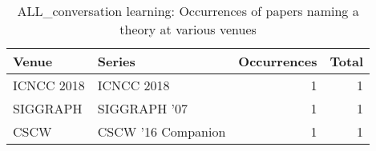 \begin{table*}[t]
\begin{tabular}{llrr}
Venue & Series & Occurrences & Total\\\hline
\multirow{1}{*}{ICNCC 2018} & ICNCC 2018 & 1 & \multirow{1}{*}{1}\\
\multirow{1}{*}{SIGGRAPH } & SIGGRAPH '07 & 1 & \multirow{1}{*}{1}\\
\multirow{1}{*}{CSCW } & CSCW '16 Companion & 1 & \multirow{1}{*}{1}\\
\end{tabular}
\caption{ALL\_conversation learning: Occurrences of papers naming a theory at various venues}
\end{table*}